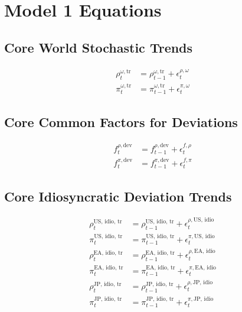 \documentclass{article}
\begin{document}
\section*{Model 1 Equations} %

\subsection*{Core World Stochastic Trends}
\begin{align}
    \rho^{\omega, \text{tr}}_t &= \rho^{\omega, \text{tr}}_{t-1} + \epsilon^{\rho, \omega}_t \\
    \pi^{\omega, \text{tr}}_t &= \pi^{\omega, \text{tr}}_{t-1} + \epsilon^{\pi, \omega}_t
\end{align}

\subsection*{Core Common Factors for Deviations}
\begin{align}
    f^{\rho, \text{dev}}_t &= f^{\rho, \text{dev}}_{t-1} + \epsilon^{f, \rho}_t \\
    f^{\pi, \text{dev}}_t &= f^{\pi, \text{dev}}_{t-1} + \epsilon^{f, \pi}_t
\end{align}

\subsection*{Core Idiosyncratic Deviation Trends}
\begin{align}
    \rho^{\text{US, idio, tr}}_t &= \rho^{\text{US, idio, tr}}_{t-1} + \epsilon^{\rho, \text{US, idio}}_t \\
    \pi^{\text{US, idio, tr}}_t &= \pi^{\text{US, idio, tr}}_{t-1} + \epsilon^{\pi, \text{US, idio}}_t \\
    \rho^{\text{EA, idio, tr}}_t &= \rho^{\text{EA, idio, tr}}_{t-1} + \epsilon^{\rho, \text{EA, idio}}_t \\
    \pi^{\text{EA, idio, tr}}_t &= \pi^{\text{EA, idio, tr}}_{t-1} + \epsilon^{\pi, \text{EA, idio}}_t \\
    \rho^{\text{JP, idio, tr}}_t &= \rho^{\text{JP, idio, tr}}_{t-1} + \epsilon^{\rho, \text{JP, idio}}_t \\
    \pi^{\text{JP, idio, tr}}_t &= \pi^{\text{JP, idio, tr}}_{t-1} + \epsilon^{\pi, \text{JP, idio}}_t
\end{align}
\end{document}
